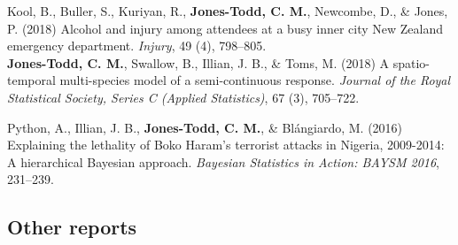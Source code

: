 \documentclass[10pt,a4paper]{moderncv}
\begin{document}
\vspace{-3pt}
Kool, B., Buller, S., Kuriyan, R., \textbf{Jones-Todd, C. M.}, Newcombe, D., \& Jones, P. (2018) Alcohol and injury among attendees at a busy inner city New Zealand emergency department. \textit{Injury}, 49 (4), 798--805.\\


  \textbf{Jones-Todd, C. M.}, Swallow, B., Illian, J. B., \& Toms, M. (2018) A spatio-temporal multi-species model of a semi-continuous response. \textit{Journal of the Royal Statistical Society, Series C (Applied Statistics)}, 67 (3), 705--722.\\
\vspace{5pt}

\vspace{-3pt}
Python, A.,  Illian, J. B., \textbf{Jones-Todd, C. M.}, \& Bl\'{a}ngiardo, M. (2016) Explaining the lethality of Boko Haram’s terrorist attacks in Nigeria, 2009-2014: A hierarchical Bayesian approach. \textit{Bayesian Statistics in Action: BAYSM 2016}, 231--239.\\










\subsection{Other reports}

\vspace{5pt}
\end{document}
